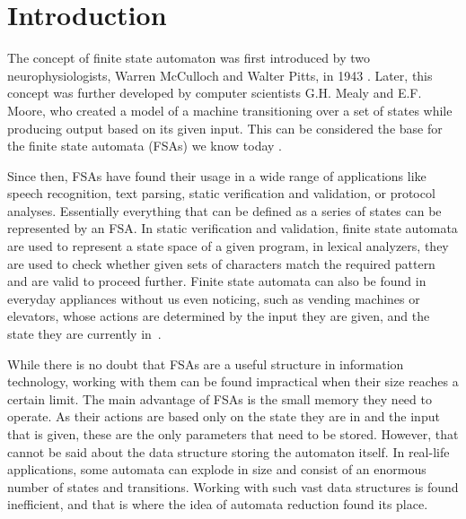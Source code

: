 
% 

\chapter{Introduction}

The concept of finite state automaton was first introduced by two neurophysiologists, Warren McCulloch and Walter Pitts, in 1943 \cite{Wolfram2002}. Later, this concept was further developed by computer scientists G.H. Mealy and E.F. Moore, who created a model of a machine transitioning over a set of states while producing output based on its given input. This can be considered the base for the finite state automata (FSAs) we know today \cite{Standford2004}.

Since then, FSAs have found their usage in a wide range of applications like speech recognition, text parsing, static verification and validation, or protocol analyses. Essentially everything that can be defined as a series of states can be represented by an FSA. In static verification and validation, finite state automata are used to represent a state space of a given program, in lexical analyzers, they are used to check whether given sets of characters match the required pattern and are valid to proceed further. Finite state automata can also be found in everyday appliances without us even noticing, such as vending machines or elevators, whose actions are determined by the input they are given, and the state they are currently in~\cite{Wright2005}.


While there is no doubt that FSAs are a useful structure in information technology, working with them can be found impractical when their size reaches a certain limit. The main advantage of FSAs is the small memory they need to operate. As their actions are based only on the state they are in and the input that is given, these are the only parameters that need to be stored. However, that cannot be said about the data structure storing the automaton itself. In real-life applications, some automata can explode in size and consist of an enormous number of states and transitions.
Working with such vast data structures is found inefficient, and that is where the idea of automata reduction found its place.



